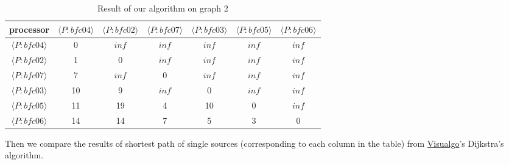 \documentclass[11pt]{article}  %
\begin{document}
\begin{table}[!htbp]
\centering
\setlength{\tabcolsep}{1mm}
\begin{tabular}{|c|c|c|c|c|c|c|}
\hline
processor&$\langle P:bfc04 \rangle$&$\langle P:bfc02\rangle$&$\langle P:bfc07\rangle$&$\langle P:bfc03\rangle$&$\langle P:bfc05\rangle$&$\langle P:bfc06\rangle$\\
\hline
$\langle P:bfc04\rangle$&0&$inf$&$inf$&$inf$&$inf$&$inf$\\
\hline
$\langle P:bfc02\rangle$&1&0&$inf$&$inf$&$inf$&$inf$\\
\hline
$\langle P:bfc07\rangle$&7&$inf$&0&$inf$&$inf$&$inf$\\
\hline
$\langle P:bfc03\rangle$&10&9&$inf$&0&$inf$&$inf$\\
\hline
$\langle P:bfc05\rangle$&11&19&4&10&0&$inf$\\
\hline
$\langle P:bfc06\rangle$&14&14&7&5&3&0\\
\hline
\end{tabular}
\caption{Result of our algorithm on graph 2}
\end{table}\par

Then we compare the results of shortest path of single sources (corresponding to each column in the table) from \href{https://visualgo.net/en/sssp}{Visualgo}'s Dijkstra's algorithm.\par
\end{document}
